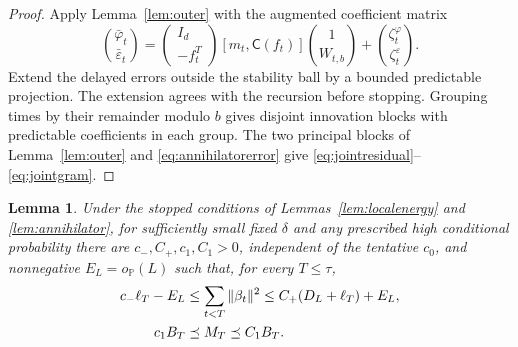 \documentclass[11pt,reqno]{amsart}
\numberwithin{equation}{section}
\newtheorem{lemma}[theorem]{Lemma}
\theoremstyle{definition}
\theoremstyle{remark}
\newcommand{\Prob}{\mathbb P}
\newcommand{\ph}{\varphi}
\begin{document}
\begin{proof}
Apply Lemma~\ref{lem:outer} with the augmented coefficient matrix
\[
 \binom{\bar\ph_t}{\bar\varepsilon_t}
 =\begin{pmatrix}I_d\\-f_t^T\end{pmatrix}
 [m_t,\mathsf C(f_t)]\binom{1}{W_{t,b}}
 +\binom{\zeta_t^\ph}{\zeta_t^\varepsilon}.
\]
Extend the delayed errors outside the stability ball by a bounded predictable projection. The extension agrees with the recursion before stopping. Grouping times by their remainder modulo $b$ gives disjoint innovation blocks with predictable coefficients in each group. The two principal blocks of Lemma~\ref{lem:outer} and \eqref{eq:annihilatorerror} give \eqref{eq:jointresidual}--\eqref{eq:jointgram}.
\end{proof}

\begin{lemma}
\label{lem:infocompare}
Under the stopped conditions of Lemmas~\ref{lem:localenergy} and \ref{lem:annihilator},
for sufficiently small fixed $\delta$ and any prescribed high
conditional probability there are $c_-,C_+,c_1,C_1>0$, independent
of the tentative $c_0$, and nonnegative $E_L=o_{\Prob}(L)$ such that,
for every $T\le\tau$,
\begin{align}
 c_-\ell_T-E_L&\le\sum_{t<T}\|\beta_t\|^2
 \le C_+(D_L+\ell_T)+E_L,\label{eq:strongenergy}\\
 c_1B_T&\preceq M_T\preceq C_1B_T.\notag
\end{align}
\end{lemma}
\end{document}
